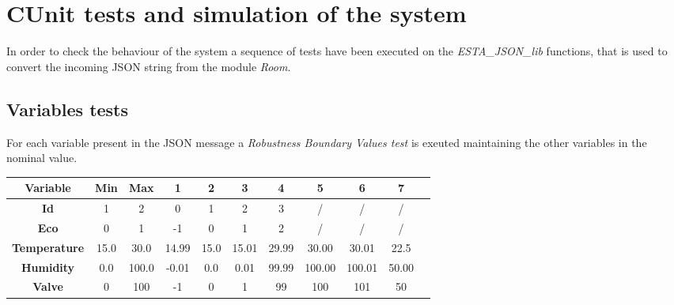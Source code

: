 \newpage
\section{CUnit tests and simulation of the system}
In order to check the behaviour of the system a sequence of tests have been executed on the \textit{ESTA\_JSON\_lib} functions, that is used to convert the incoming JSON string from the module \textit{Room}.

\subsection{Variables tests}
For each variable present in the JSON message a \textit{Robustness Boundary Values test} is exeuted maintaining the other variables in the nominal value.
\newline
\begin{center}
	\begin{tabular}{|| c | c | c | c | c | c | c | c | c | c | c||} 
		\hline
		Variable				& 	Min 	& Max 	& 1\degree	& 2\degree & 3\degree	& 4\degree & 5\degree	& 6\degree & 7\degree\\ 
		\hline
		\textbf{Id}				&	1 		& 2		& 0 	& 1 	& 2 	& 3 	& / 	& / 	& / \\ 
		\hline
		\textbf{Eco}			&	0 		& 1		& -1  	& 0 	& 1 	& 2 	& / 	& /		& / \\ 
		\hline
		\textbf{Temperature}	&	15.0 	& 30.0	& 14.99 & 15.0 	& 15.01 & 29.99	& 30.00 & 30.01 & 22.5 \\ 
		\hline
		\textbf{Humidity}		&	0.0		& 100.0	& -0.01	& 0.0 	& 0.01 	& 99.99 & 100.00 & 100.01 & 50.00 \\ 
		\hline
		\textbf{Valve}			&	0		& 100 	& -1 	& 0 	& 1 	& 99 	& 100 	& 101 	& 50 \\ 
		\hline
	\end{tabular}
\end{center}

